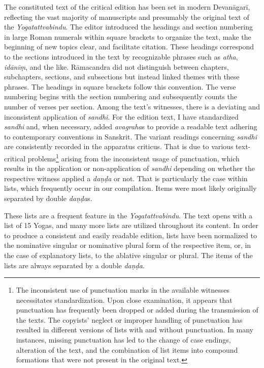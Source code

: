 The constituted text of the critical edition has been set in modern Devanāgarī, reflecting the vast majority of manuscripts and presumably the original text of the \textit{Yogatattvabindu}.
The editor introduced the headings and section numbering in large Roman numerals within square brackets to organize the text, make the beginning of new topics clear, and facilitate citation. These headings correspond to the sections introduced in the text by recognizable phrases such as \textit{atha}, \textit{idānīṃ}, and the like. Rāmacandra did not distinguish between chapters, subchapters, sections, and subsections but instead linked themes with these phrases. The headings in square brackets follow this convention. The verse numbering begins with the section numbering and subsequently counts the number of verses per section.
Among the text's witnesses, there is a deviating and inconsistent application of \textit{sandhi}. For the edition text, I have standardized \textit{sandhi} and, when necessary, added \textit{avagraha}s to provide a readable text adhering to contemporary conventions in Sanskrit. The variant readings concerning \textit{sandhi} are consistently recorded in the apparatus criticus. That is due to various text-critical problems\footnote{The inconsistent use of punctuation marks in the available witnesses necessitates standardization. Upon close examination, it appears that punctuation has frequently been dropped or added during the transmission of the texts. The copyists' neglect or improper handling of punctuation has resulted in different versions of lists with and without punctuation. In many instances, missing punctuation has led to the change of case endings, alteration of the text, and the combination of list items into compound formations that were not present in the original text.} arising from the inconsistent usage of punctuation, which results in the application or non-application of \textit{sandhi} depending on whether the respective witness applied a \textit{daṇḍa} or not. That is particularly the case within lists, which frequently occur in our compilation. Items were most likely originally separated by double \textit{daṇḍa}s.

These lists are a frequent feature in the \textit{Yogatattvabindu}. The text opens with a list of 15 Yogas, and many more lists are utilized throughout its content. In order to produce a consistent and easily readable edition, lists have been normalized to the nominative singular or nominative plural form of the respective item, or, in the case of explanatory lists, to the ablative singular or plural. The items of the lists are always separated by a double \textit{daṇḍa}.

